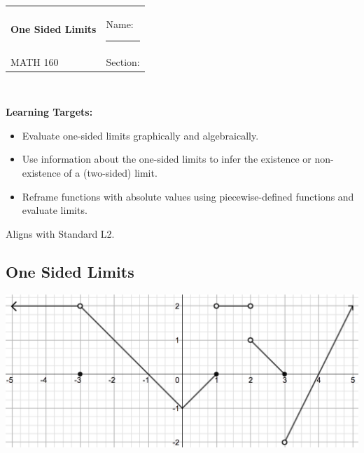 \documentclass[12pt]{report}
\begin{document}
\begin{tabular*}{\textwidth}{@{\extracolsep{\fill}}ll}
\textbf{One Sided Limits}  & Name: \rule{6cm}{0.5pt} \\
MATH 160 & Section:\hspace{1in} \\
\hline\hline
\end{tabular*} \\


\sf
\textbf{Learning Targets:}
\begin{itemize}
\item Evaluate one-sided limits graphically and algebraically.				
\item Use information about the one-sided limits to infer the existence or non-existence of a (two-sided) limit.
\item Reframe functions with absolute values using piecewise-defined functions and evaluate limits.
 \end{itemize}
Aligns with Standard L2. \rm

\hrulefill 

\subsection*{One Sided Limits}

\includegraphics[scale=0.75]{2_4_pic1.png}
\end{document}
